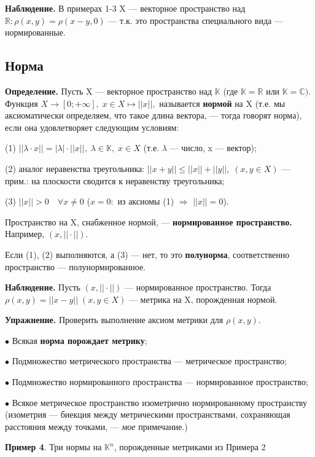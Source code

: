 \documentclass[12pt,a4paper]{article}
\begin{document}
\textbf{Наблюдение.} В примерах 1-3 X --- векторное пространство над $\mathbb{R}\!\!: \rho(x, y) = \rho(x - y, 0)$ --- т.к. это пространства специального вида --- нормированные. 

\subsection{Норма}

\textbf{Определение.} Пусть X --- векторное пространство над $\mathbb{K}$ (где $\mathbb{K} = \mathbb{R}$ или $\mathbb{K} = \mathbb{C}).$ Функция $X \to [0; +\infty], \; x \in X \mapsto ||x||,$ называется \textbf{нормой} на X (т.е. мы аксиоматически определяем, что такое длина вектора, --- тогда говорят норма), если она удовлетворяет следующим условиям: 

(1) $||\lambda \cdot x|| = |\lambda| \cdot ||x||, \; \lambda \in \mathbb{K}, \; x \in X$ (т.е. $\lambda$ --- число, x --- вектор);

(2) аналог неравенства треугольника: $||x + y|| \leq ||x|| + ||y||, \; (x, y \in X)$ --- прим.: на плоскости сводится к неравенству треугольника; 

(3) $||x|| > 0 \quad \forall x \neq 0$ ($x = 0:$ из аксиомы (1) $\Rightarrow$ $||x|| = 0$). 

Пространство на X, снабженное нормой, --- \textbf{нормированное пространство.} Например, $(x, ||\cdot||).$

Если (1), (2) выполняются, а (3) --- нет, то это \textbf{полунорма}, соответственно пространство --- полунормированное. 

\textbf{Наблюдение.} Пусть $(x, ||\cdot||)$ --- нормированное пространство. Тогда $\rho(x, y) = ||x - y|| \; (x, y \in X)$ --- метрика на X, порожденная нормой.  

\textbf{Упражнение.} Проверить выполнение аксиом метрики для $\rho(x, y).$ 

$\bullet$ Всякая \textbf{норма порождает метрику}; 

$\bullet$ Подмножество метрического пространства --- метрическое пространство; 

$\bullet$ Подмножество нормированного пространства --- нормированное пространство;  

$\bullet$ Всякое метрическое пространство изометрично нормированному пространству (изометрия --- биекция между метрическими пространствами, сохраняющая расстояния между точками, --- \textit{мое} примечание.)

\textbf{Пример 4}. Три нормы на $\mathbb{K}^{n}$, порожденные метриками из Примера 2
\end{document}
